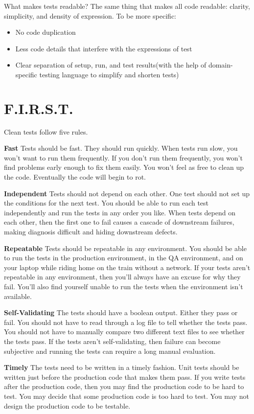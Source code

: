 What makes tests readable? The same thing that makes all code readable: clarity, simplicity, and density of expression.
To be more specific:

\begin{itemize}
    \item No code duplication
    \item Less code details that interfere with the expressions of test
    \item Clear separation of setup, run, and test results(with the help of domain-specific testing language to simplify
    and shorten tests)
\end{itemize}

\section{F.I.R.S.T.}

Clean tests follow five rules.

\textbf{Fast} Tests should be fast. They should run quickly. When tests run slow, you won't want to run them frequently.
If you don't run them frequently, you won't find problems early enough to fix them easily. You won't feel as free to
clean up the code. Eventually the code will begin to rot.

\textbf{Independent} Tests should not depend on each other. One test should not set up the conditions for the next test.
You should be able to run each test independently and run the tests in any order you like. When tests depend on each
other, then the first one to fail causes a cascade of downstream failures, making diagnosis difficult and hiding
downstream defects.

\textbf{Repeatable} Tests should be repeatable in any environment. You should be able to run the tests in the production
environment, in the QA environment, and on your laptop while riding home on the train without a network. If your tests
aren't repeatable in any environment, then you'll always have an excuse for why they fail. You'll also find yourself
unable to run the tests when the environment isn't available.

\textbf{Self-Validating} The tests should have a boolean output. Either they pass or fail. You should not have to read
through a log file to tell whether the tests pass. You should not have to manually compare two different text files to
see whether the tests pass. If the tests aren't self-validating, then failure can become subjective and running the
tests can require a long manual evaluation.

\textbf{Timely} The tests need to be written in a timely fashion. Unit tests should be written just before the
production code that makes them pass. If you write tests after the production code, then you may find the production
code to be hard to test. You may decide that some production code is too hard to test. You may not design the production
code to be testable.
